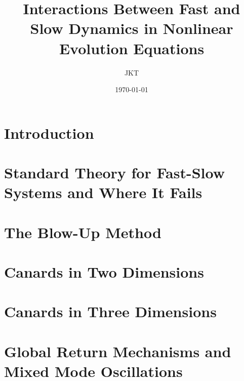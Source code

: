 \documentclass[11pt]{article}
\title{Interactions Between Fast and Slow Dynamics in Nonlinear Evolution Equations}
\author{JKT}
\date{\today}
\begin{document}
\maketitle
\newpage
{} %
\tableofcontents
\listoffigures

\newpage
{} %
\pagestyle{fancy}

\begin{abstract}
	
\end{abstract}


\section{Introduction}\label{Intro}


\section{Standard Theory for Fast-Slow Systems and Where It Fails} \label{GSPT}


%


\section{The Blow-Up Method}\label{sec: VDP Blowup}


\section{Canards in Two Dimensions}\label{sec:canard-points}



\section{Canards in Three Dimensions} \label{sec: threedimfolds}



\section{Global Return Mechanisms and Mixed Mode Oscillations}\label{sec:MMO}

\end{document}
